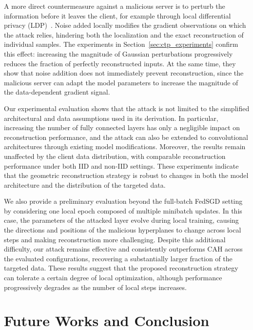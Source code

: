 A more direct countermeasure against a malicious server is to perturb the information before it leaves the client, for example through local differential privacy (LDP)~\cite{dp_dwork}. Noise added locally modifies the gradient observations on which the attack relies, hindering both the localization and the exact reconstruction of individual samples. The experiments in Section~\ref{sec:ctp_experiments} confirm this effect: increasing the magnitude of Gaussian perturbations progressively reduces the fraction of perfectly reconstructed inputs. At the same time, they show that noise addition does not immediately prevent reconstruction, since the malicious server can adapt the model parameters to increase the magnitude of the data-dependent gradient signal. 

Our experimental evaluation shows that the attack is not limited to the simplified architectural and data assumptions used in its derivation. In particular, increasing the number of fully connected layers has only a negligible impact on reconstruction performance, and the attack can also be extended to convolutional architectures through existing model modifications. Moreover, the results remain unaffected by the client data distribution, with comparable reconstruction performance under both IID and non-IID settings. These experiments indicate that the geometric reconstruction strategy is robust to changes in both the model architecture and the distribution of the targeted data.

We also provide a preliminary evaluation beyond the full-batch FedSGD setting by considering one local epoch composed of multiple minibatch updates. In this case, the parameters of the attacked layer evolve during local training, causing the directions and positions of the malicious hyperplanes to change across local steps and making reconstruction more challenging. Despite this additional difficulty, our attack remains effective and consistently outperforms CAH across the evaluated configurations, recovering a substantially larger fraction of the targeted data. These results suggest that the proposed reconstruction strategy can tolerate a certain degree of local optimization, although performance progressively degrades as the number of local steps increases.



\section{Future Works and Conclusion}\label{sec:conclusions}

